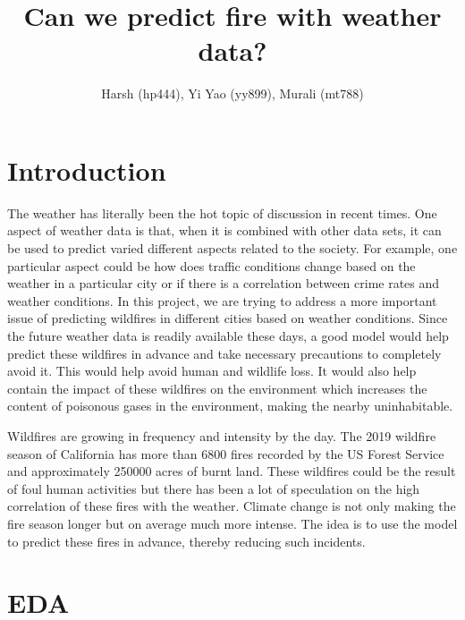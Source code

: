 \documentclass[10pt]{article}
\begin{document}
\title{\bf Can we predict fire with weather data?}
\author{Harsh (hp444), Yi Yao (yy899), Murali (mt788)}
\maketitle

\tableofcontents
\newpage

\section{Introduction}
The weather has literally been the hot topic of discussion in recent times.
One aspect of weather data is that, when it is combined with other data
sets, it can be used to predict varied different aspects related to
the society. For example, one particular aspect could be how does traffic
conditions change based on the weather in a particular city or if there is
a correlation between crime rates and weather conditions. In this project,
we are trying to address a more important issue of predicting wildfires in
different cities based on weather conditions. Since the future weather data
is readily available these days, a good model would help predict these
wildfires in advance and take necessary precautions to completely avoid it.
This would help avoid human and wildlife loss. It would also help contain
the impact of these wildfires on the environment which increases the
content of poisonous gases in the environment, making the nearby
uninhabitable.\par
Wildfires are growing in frequency and intensity by the day. The 2019
wildfire season of California has more than 6800 fires recorded by the US
Forest Service and approximately 250000 acres of burnt land. These
wildfires could be the result of foul human activities but there has been
a lot of speculation on the high correlation of these fires with the
weather. Climate change is not only making the fire season longer but on
average much more intense. The idea is to use the model to predict these
fires in advance, thereby reducing such incidents.\par
\section{EDA}
\end{document}
